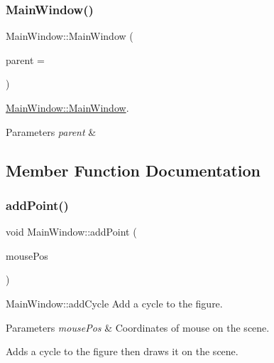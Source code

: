 \subsubsection{\texorpdfstring{Main\+Window()}{MainWindow()}}
{\footnotesize\ttfamily Main\+Window\+::\+Main\+Window (\begin{DoxyParamCaption}\item[{Q\+Widget $\ast$}]{parent = {} }\end{DoxyParamCaption})\hspace{0.3cm}{\ttfamily [explicit]}}



\mbox{\hyperlink{class_main_window_a8b244be8b7b7db1b08de2a2acb9409db}{Main\+Window\+::\+Main\+Window}}. 


\begin{DoxyParams}{Parameters}
{\em parent} & \\
\hline
\end{DoxyParams}


\subsection{Member Function Documentation}
\mbox{\label{class_main_window_aa33398d6788bcd727486b5fff5c238e4}} 
\subsubsection{\texorpdfstring{add\+Point()}{addPoint()}}
{\footnotesize\ttfamily void Main\+Window\+::add\+Point (\begin{DoxyParamCaption}\item[{Q\+PointF}]{mouse\+Pos }\end{DoxyParamCaption})}



Main\+Window\+::add\+Cycle Add a cycle to the figure. 


\begin{DoxyParams}{Parameters}
{\em mouse\+Pos} & Coordinates of mouse on the scene.\\
\hline
\end{DoxyParams}
Adds a cycle to the figure then draws it on the scene. \mbox{\label{class_main_window_ad0adb1cd734f6bba159f13fd332d62f5}} 
